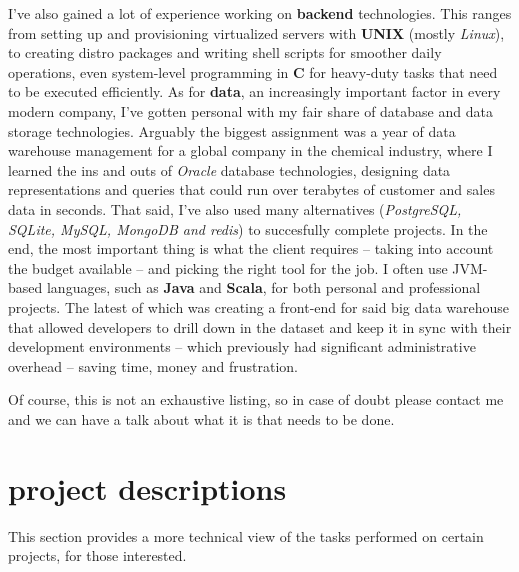 \documentclass[]{friggeri-cv}
\begin{document}
I've also gained a lot of experience working on \textbf{backend} technologies. This ranges from setting up and provisioning virtualized servers with \textbf{UNIX} (mostly \emph{Linux}), to creating distro packages and writing shell scripts for smoother daily operations, even system-level programming in \textbf{C} for heavy-duty tasks that need to be executed efficiently. As for \textbf{data}, an increasingly important factor in every modern company, I've gotten personal with my fair share of database and data storage technologies. Arguably the biggest assignment was a year of data warehouse management for a global company in the chemical industry, where I learned the ins and outs of \emph{Oracle} database technologies, designing data representations and queries that could run over terabytes of customer and sales data in seconds. That said, I've also used many alternatives (\emph{PostgreSQL, SQLite, MySQL, MongoDB and redis}) to succesfully complete projects. In the end, the most important thing is what the client requires -- taking into account the budget available -- and picking the right tool for the job. I often use JVM-based languages, such as \textbf{Java} and \textbf{Scala}, for both personal and professional projects. The latest of which was creating a front-end for said big data warehouse that allowed developers to drill down in the dataset and keep it in sync with their development environments -- which previously had significant administrative overhead -- saving time, money and frustration.

Of course, this is not an exhaustive listing, so in case of doubt please contact me and we can have a talk about what it is that needs to be done.

\section{project descriptions}

This section provides a more technical view of the tasks performed on certain projects, for those interested.
\end{document}
